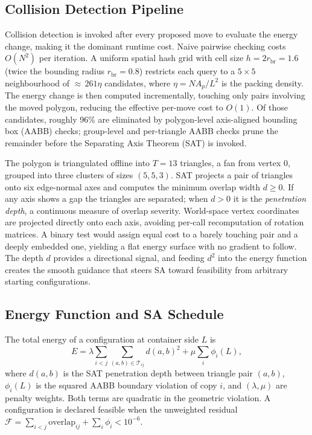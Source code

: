 \documentclass[10pt,twocolumn]{article}
\begin{document}
\subsection{Collision Detection Pipeline}

Collision detection is invoked after every proposed move to evaluate
the energy change, making it the dominant runtime cost. Naive pairwise
checking costs $O(N^2)$ per iteration. A uniform spatial hash grid
with cell size $h = 2r_{\mathrm{br}} = 1.6$ (twice the bounding
radius $r_{\mathrm{br}} = 0.8$) restricts each query to a
$5 \times 5$ neighbourhood of ${\approx}\,261\eta$ candidates, where
$\eta = NA_p/L^2$ is the packing density. The energy change is then
computed incrementally, touching only pairs involving the moved
polygon, reducing the effective per-move cost to $O(1)$. Of those
candidates, roughly 96\% are eliminated by polygon-level
axis-aligned bounding box (AABB) checks; group-level and per-triangle
AABB checks prune the remainder before the Separating Axis Theorem
(SAT) is invoked.

The polygon is triangulated offline into $T = 13$ triangles, a fan
from vertex 0, grouped into three clusters of sizes $(5, 5, 3)$.
SAT projects a pair of triangles onto six edge-normal axes and
computes the minimum overlap width $d \geq 0$. If any axis shows a
gap the triangles are separated; when $d > 0$ it is the
\emph{penetration depth}, a continuous measure of overlap severity.
World-space vertex coordinates are projected directly onto each axis,
avoiding per-call recomputation of rotation matrices. A binary test
would assign equal cost to a barely touching pair and a deeply
embedded one, yielding a flat energy surface with no gradient to
follow. The depth $d$ provides a directional signal, and feeding
$d^2$ into the energy function creates the smooth guidance that steers
SA toward feasibility from arbitrary starting configurations.

\subsection{Energy Function and SA Schedule}

The total energy of a configuration at container side $L$ is
\begin{equation}
  E = \lambda \!\sum_{i<j}\sum_{(a,b)\in\mathcal{T}_{ij}}
  d(a,b)^{2}
  + \mu \sum_i \phi_i(L),
  \label{eq:energy}
\end{equation}
where $d(a,b)$ is the SAT penetration depth between triangle pair
$(a, b)$, $\phi_i(L)$ is the squared AABB boundary violation of copy
$i$, and $(\lambda, \mu)$ are penalty weights. Both terms are
quadratic in the geometric violation. A configuration is declared
feasible when the unweighted residual
$\mathcal{F} = \sum_{i<j} \text{overlap}_{ij} + \sum_i \phi_i < 10^{-6}$.
\end{document}
